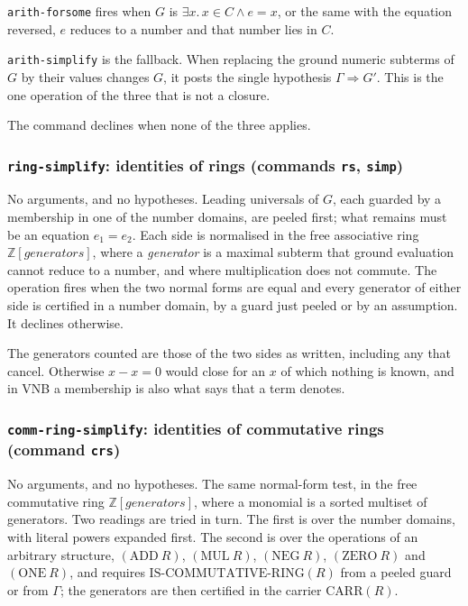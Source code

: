 \texttt{arith-forsome} fires when $G$ is
$\exists x.\, x \in C \wedge e = x$, or the same with the equation
reversed, $e$ reduces to a number and that number lies in $C$.

\texttt{arith-simplify} is the fallback.  When replacing the ground
numeric subterms of $G$ by their values changes $G$, it posts the single
hypothesis $\Gamma \Longrightarrow G'$.  This is the one operation of the
three that is not a closure.

The command declines when none of the three applies.

\subsubsection*{\texttt{ring-simplify}: identities of rings
  (commands \texttt{rs}, \texttt{simp})}

No arguments, and no hypotheses.  Leading universals of $G$, each guarded
by a membership in one of the number domains, are peeled first; what
remains must be an equation $e_1 = e_2$.  Each side is normalised in the
free associative ring $\mathbb{Z}[\textit{generators}]$, where a
\emph{generator} is a maximal subterm that ground evaluation cannot
reduce to a number, and where multiplication does not commute.  The
operation fires when the two normal forms are equal and every generator
of either side is certified in a number domain, by a guard just peeled or
by an assumption.  It declines otherwise.

The generators counted are those of the two sides as written, including
any that cancel.  Otherwise $x - x = 0$ would close for an $x$ of which
nothing is known, and in VNB a membership is also what says that a term
denotes.

\subsubsection*{\texttt{comm-ring-simplify}: identities of commutative rings
  (command \texttt{crs})}

No arguments, and no hypotheses.  The same normal-form test, in the free
commutative ring $\mathbb{Z}[\textit{generators}]$, where a monomial is a
sorted multiset of generators.  Two readings are tried in turn.  The
first is over the number domains, with literal powers expanded first.
The second is over the operations of an arbitrary structure,
$(\mathrm{ADD}\ R)$, $(\mathrm{MUL}\ R)$, $(\mathrm{NEG}\ R)$,
$(\mathrm{ZERO}\ R)$ and $(\mathrm{ONE}\ R)$, and requires
$\mathrm{IS\text{-}COMMUTATIVE\text{-}RING}(R)$ from a peeled guard or
from $\Gamma$; the generators are then certified in the carrier
$\mathrm{CARR}(R)$.

